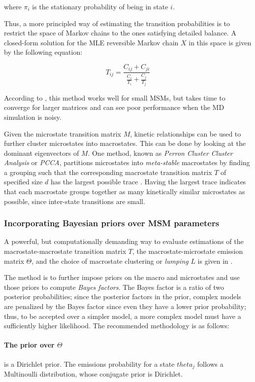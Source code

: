 \documentclass{article}
\begin{document}
\noindent where $\pi_i$ is the stationary probability of being in state $i$.

Thus, a more principled way of estimating the transition probabilities is to restrict the space of Markov chains to the ones satisfying detailed balance. A closed-form solution for the MLE reversible Markov chain $X$ in this space is given by the following equation:

$$T_{ij} = \dfrac{C_{ij} + C_{ji}}{\frac{C_i}{T_i} + \frac{C_j}{T_j}}$$

According to \cite{pande2009}, this method works well for small MSMs, but takes time to converge for larger matrices and can see poor performance when the MD simulation is noisy. 

Given the microstate transition matrix $M$, kinetic relationships can be used to further cluster microstates into macrostates. This can be done by looking at the dominant eigenvectors of $M$. One method, known as \textit{Perron Cluster Cluster Analysis} or \textit{PCCA}, partitions microstates into \textit{meta-stable} macrostates by finding a grouping such that the corresponding macrostate transition matrix $T$ of specified size $d$ has the largest possible trace \cite{fishbach}. Having the largest trace indicates that each macrostate groups together as many kinetically similar microstates as possible, since inter-state transitions are small.

\subsubsection{Incorporating Bayesian priors over MSM parameters}
A powerful, but computationally demanding way to evaluate estimations of the macrostate-macrostate transition matrix $T$, the macrostate-microstate emission matrix $\Theta$, and the choice of macrostate clustering or \textit{lumping} $L$ is given in \cite{msmprior}. 

The method is to further impose priors on the macro and microstates and use those priors to compute \textit{Bayes factors}. The Bayes factor is a ratio of two posterior probabilities; since the posterior factors in the prior, complex models are penalized by the Bayes factor since even they have a lower prior probability; thus, to be accepted over a simpler model, a more complex model must have a sufficiently higher likelihood. The recommended methodology is as follows:

\paragraph{The prior over $\Theta$} is a Dirichlet prior. The emissions probability for a state $theta_j$ follows a Multinoulli distribution, whose conjugate prior is Dirichlet. 
\end{document}
